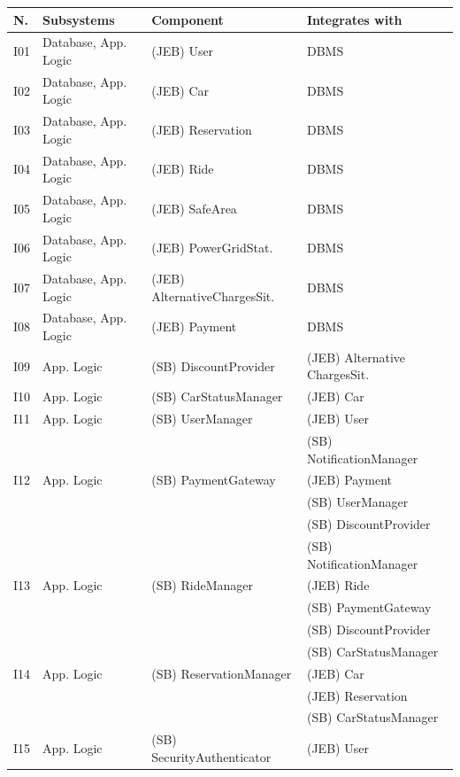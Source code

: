 \newpage
\begingroup
\setlength{\LTleft}{-20cm plus -1fill}
\setlength{\LTright}{\LTleft}
\begin{longtable}{p{} | p{} | p{} | p{}}
\hline
\textbf{N.} & \textbf{Subsystems} & \textbf{Component} & \textbf{Integrates with} \\
\hline
I01 & Database, App. Logic & (JEB) User & DBMS \\
\hline
I02 & Database, App. Logic & (JEB) Car & DBMS \\
\hline
I03 & Database, App. Logic & (JEB) Reservation & DBMS \\
\hline
I04 & Database, App. Logic & (JEB) Ride & DBMS \\
\hline
I05 & Database, App. Logic & (JEB) SafeArea & DBMS \\
\hline
I06 & Database, App. Logic & (JEB) PowerGridStat. & DBMS \\
\hline
I07 & Database, App. Logic & (JEB) AlternativeChargesSit. & DBMS \\
\hline
I08 & Database, App. Logic & (JEB) Payment & DBMS \\
\hline
I09 & App. Logic & (SB) DiscountProvider & (JEB) Alternative ChargesSit. \\
\hline
I10 & App. Logic & (SB) CarStatusManager & (JEB) Car \\
\hline
I11 & App. Logic & (SB) UserManager & (JEB) User \\
									& & & (SB) NotificationManager \\
\hline
I12 & App. Logic & (SB) PaymentGateway & (JEB) Payment \\
									   & & & (SB) UserManager \\ 
									   & & & (SB) DiscountProvider \\ 
									   & & & (SB) NotificationManager \\
\hline
I13 & App. Logic & (SB) RideManager & (JEB) Ride \\
									& & & (SB) PaymentGateway \\
									& & & (SB) DiscountProvider \\
									& & & (SB) CarStatusManager \\
\hline
I14 & App. Logic & (SB) ReservationManager & (JEB) Car \\
										   & & & (JEB) Reservation \\
										   & & & (SB) CarStatusManager \\
\hline
I15 & App. Logic & (SB) SecurityAuthenticator & (JEB) User \\

\end{longtable}
